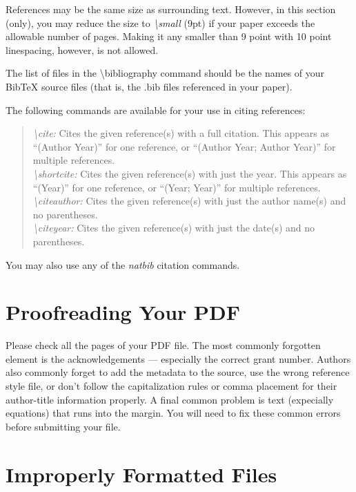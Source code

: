 References may be the same size as surrounding text. However, in this
section (only), you may reduce the size to \emph{\textbackslash small}
(9pt) if your paper exceeds the allowable number of pages. Making it any
smaller than 9 point with 10 point linespacing, however, is not allowed.

The list of files in the \textbackslash bibliography command should be
the names of your BibTeX source files (that is, the .bib files
referenced in your paper).

The following commands are available for your use in citing references:

\begin{quote}
{\em \textbackslash cite:} Cites the given reference(s) with a full citation. This appears as ``(Author Year)'' for one reference, or ``(Author Year; Author Year)'' for multiple references.\smallskip\\
{\em \textbackslash shortcite:} Cites the given reference(s) with just the year. This appears as ``(Year)'' for one reference, or ``(Year; Year)'' for multiple references.\smallskip\\
{\em \textbackslash citeauthor:} Cites the given reference(s) with just the author name(s) and no parentheses.\smallskip\\
{\em \textbackslash citeyear:} Cites the given reference(s) with just the date(s) and no parentheses.
\end{quote}

You may also use any of the \emph{natbib} citation commands.

\section{Proofreading Your PDF}

Please check all the pages of your PDF file. The most commonly forgotten
element is the acknowledgements --- especially the correct grant number.
Authors also commonly forget to add the metadata to the source, use the
wrong reference style file, or don't follow the capitalization rules or
comma placement for their author-title information properly. A final
common problem is text (expecially equations) that runs into the margin.
You will need to fix these common errors before submitting your file.

\section{Improperly Formatted Files }

